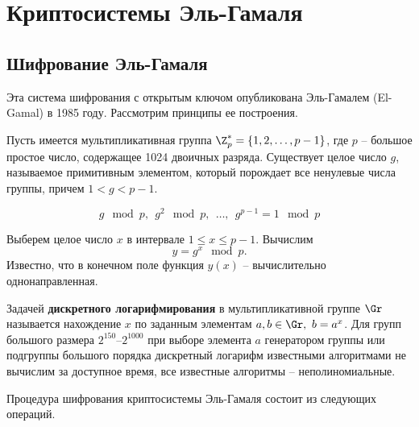 \section{Криптосистемы Эль-Гамаля}

\subsection[Шифрование]{Шифрование Эль-Гамаля}

Эта система шифрования с открытым ключом опубликована Эль-Гамалем (El-Gamal) в 1985 году. Рассмотрим принципы ее построения.

Пусть имеется мультипликативная группа $\Z_p^* = \{1, 2, \dots, p-1\}$, где $p$ -- большое простое число, содержащее 1024 двоичных разряда. Существует целое число $g$, называемое примитивным элементом, который порождает все ненулевые числа группы, причем $1 < g < p-1$.

    \[ g\mod p, ~~ g^2\mod p, ~~ \dots, ~~ g^{p-1} = 1\mod p \]

Выберем целое число $x$ в интервале $1 \le x \le p-1$. Вычислим
    \[ y = g^x \mod p. \]
Известно, что в конечном поле функция $y(x)$ -- вычислительно однонаправленная.

Задачей \textbf{дискретного логарифмирования} в мультипликативной группе $\Gr$ называется нахождение $x$ по заданным элементам $a,b \in \Gr, ~ b = a^x$. Для групп большого размера $2^{150}$--$2^{1000}$ при выборе элемента $a$ генератором группы или подгруппы большого порядка дискретный логарифм известными алгоритмами не вычислим за доступное время, все известные алгоритмы -- неполиномиальные.

Процедура шифрования криптосистемы  Эль-Гамаля состоит из следующих операций.


